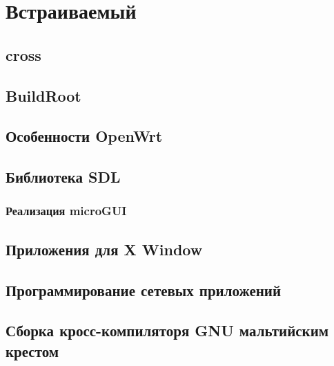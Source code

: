 \part{Встраиваемый \emlinux}





\chapter{cross}

\chapter{BuildRoot}

\chapter{Особенности OpenWrt}

\chapter{Библиотека SDL}

\section{Реализация microGUI}

\chapter{Приложения для X Window}

\chapter{Программирование сетевых приложений}

\chapter{Сборка кросс-компиляторя GNU мальтийским крестом}
